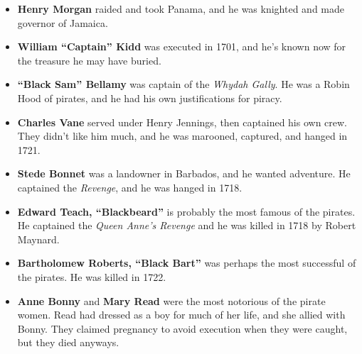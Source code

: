 \begin{itemize}
  \item
    \textbf{Henry Morgan} raided and took Panama, and he was knighted and made governor of Jamaica.

  \item
    \textbf{William ``Captain'' Kidd} was executed in 1701,
    and he's known now for the treasure he may have buried.

  \item
    \textbf{``Black Sam'' Bellamy} was captain of the \textit{Whydah Gally}.
    He was a Robin Hood of pirates, and he had his own justifications for piracy.

  \item
    \textbf{Charles Vane} served under Henry Jennings, then captained his own crew.
    They didn't like him much, and he was marooned, captured, and hanged in 1721.

  \item
    \textbf{Stede Bonnet} was a landowner in Barbados, and he wanted adventure.
    He captained the \textit{Revenge}, and he was hanged in 1718.

  \item
    \textbf{Edward Teach, ``Blackbeard''} is probably the most famous of the pirates.
    He captained the \textit{Queen Anne's Revenge} and he was killed in 1718 by Robert Maynard.

  \item
    \textbf{Bartholomew Roberts, ``Black Bart''} was perhaps the most successful of the pirates.
    He was killed in 1722.

  \item
    \textbf{Anne Bonny} and \textbf{Mary Read} were the most notorious of the pirate women.
    Read had dressed as a boy for much of her life, and she allied with Bonny.
    They claimed pregnancy to avoid execution when they were caught, but they died anyways.
\end{itemize}
